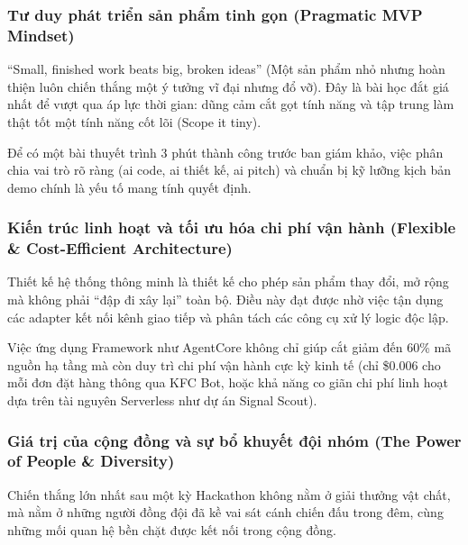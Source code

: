\hypertarget{tux1b0-duy-phuxe1t-triux1ec3n-sux1ea3n-phux1ea9m-tinh-gux1ecdn-pragmatic-mvp-mindset}{%
\subsubsection{Tư duy phát triển sản phẩm tinh gọn (Pragmatic MVP
Mindset)}}

``Small, finished work beats big, broken ideas'' (Một sản phẩm nhỏ nhưng
hoàn thiện luôn chiến thắng một ý tưởng vĩ đại nhưng đổ vỡ). Đây là bài
học đắt giá nhất để vượt qua áp lực thời gian: dũng cảm cắt gọt tính
năng và tập trung làm thật tốt một tính năng cốt lõi (Scope it tiny).

Để có một bài thuyết trình 3 phút thành công trước ban giám khảo, việc
phân chia vai trò rõ ràng (ai code, ai thiết kế, ai pitch) và chuẩn bị
kỹ lưỡng kịch bản demo chính là yếu tố mang tính quyết định.

\hypertarget{kiux1ebfn-truxfac-linh-houx1ea1t-vuxe0-tux1ed1i-ux1b0u-huxf3a-chi-phuxed-vux1eadn-huxe0nh-flexible-cost-efficient-architecture}{%
\subsubsection{Kiến trúc linh hoạt và tối ưu hóa chi phí vận hành
(Flexible \& Cost-Efficient
Architecture)}}

Thiết kế hệ thống thông minh là thiết kế cho phép sản phẩm thay đổi, mở
rộng mà không phải ``đập đi xây lại'' toàn bộ. Điều này đạt được nhờ
việc tận dụng các adapter kết nối kênh giao tiếp và phân tách các công
cụ xử lý logic độc lập.

Việc ứng dụng Framework như AgentCore không chỉ giúp cắt giảm đến 60\%
mã nguồn hạ tầng mà còn duy trì chi phí vận hành cực kỳ kinh tế (chỉ
\$0.006 cho mỗi đơn đặt hàng thông qua KFC Bot, hoặc khả năng co giãn
chi phí linh hoạt dựa trên tài nguyên Serverless như dự án Signal
Scout).

\hypertarget{giuxe1-trux1ecb-cux1ee7a-cux1ed9ng-ux111ux1ed3ng-vuxe0-sux1ef1-bux1ed5-khuyux1ebft-ux111ux1ed9i-nhuxf3m-the-power-of-people-diversity}{%
\subsubsection{Giá trị của cộng đồng và sự bổ khuyết đội nhóm (The Power
of People \&
Diversity)}}

Chiến thắng lớn nhất sau một kỳ Hackathon không nằm ở giải thưởng vật
chất, mà nằm ở những người đồng đội đã kề vai sát cánh chiến đấu trong
đêm, cùng những mối quan hệ bền chặt được kết nối trong cộng đồng.

